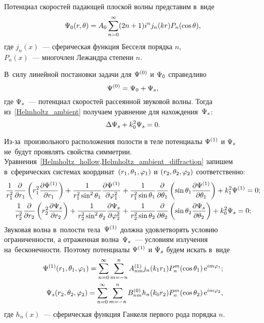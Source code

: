 Потенциал скоростей падающей плоской волны представим в~виде
\begin{equation}
\P_0(r, \Q) = A_0 \sum\limits_{n = 0}^{\infty} (2n + 1) i^n j_n(kr) P_n(\cos\Q),
\end{equation}
где $j_n(x)$~--- сферическая функция Бесселя порядка $n$, \\
$P_n(x)$~--- многочлен Лежандра степени $n$.


В~силу линейной постановки задачи для $\P^{(0)}$ и $\P_0$ справедливо
\begin{equation} \label{potention_speed_ambient}
\P^{(0)} = \P_0 + \P_s,
\end{equation}
где $\P_s$~--- потенциал скоростей рассеянной звуковой волны. Тогда из~\eqref{Helmholtz_ambient} получаем уравнение для нахождения~$\P_s$:
\begin{equation} \label{Helmholtz_ambient_diffraction}
\Lap\P_s + k_0^2\P_s = 0.
\end{equation}

Из-за~произвольного расположения полости в теле потенциалы $\P^{(1)}$ и $\P_s$ не~будут проявлять свойства симметрии.
Уравнения~\cref{Helmholtz_hollow,Helmholtz_ambient_diffraction} запишем в~сферических системах координат~$(r_1, \Q_1, \f_1)$ и $(r_2, \Q_2, \f_2)$ соответственно:
\begin{align}
\fr1{r_1^2}\fr\de{\de r_1}\left(r_1^2 \fr{\de\P^{(1)}}{\de r_1}\right) + \fr1{r_1^2\sin^2\Q_1}\fr{\de\P^{(1)}}{\de\f_1^2} &+ \fr1{r_1^2\sin\Q_1}\fr\de{\de\Q_1} \left(\sin\Q_1 \fr{\de\P^{(1)}}{\de\Q_1}\right) + k_1^2\P^{(1)} = 0;\\
\fr1{r_2^2}\fr\de{\de r_2}\left(r_2^2 \fr{\de\P_s}{\de r_2}\right) + \fr1{r_2^2\sin^2\Q_2}\fr{\de\P_s}{\de\f_2^2} &+ \fr1{r_2^2\sin\Q_2}\fr\de{\de\Q_2} \left(\sin\Q_2 \fr{\de\P_s}{\de\Q_2}\right) + k_0^2\P_s = 0;
\end{align}
Звуковая волна в~полости тела~$\P^{(1)}$ должна удовлетворять условию ограниченности, а отраженная волна~$\P_s$~--- условиям излучения на~бесконечности. Поэтому потенциалы $\P^{(1)}$ и $\P_s$ будем искать в~виде 
\begin{align}
\P^{(1)}(r_1, \Q_1, \f_1) = \sum\limits_{n = 0}^\infty \sum\limits_{m = -n}^n A_{nm}^{(1)} j_n(k_1 r_1) P_n^m(\cos\Q_1)\e^{im\f_1};\\
\P_s(r_2, \Q_2, \f_2) = \sum\limits_{n = 0}^\infty \sum\limits_{m = -n}^n B_{nm}^{(0)} h_n(k_0 r_2) P_n^m(\cos\Q_2)\e^{im\f_2},
\end{align}
где $h_n(x)$~--- сферическая функция Ганкеля первого рода порядка $n$.

